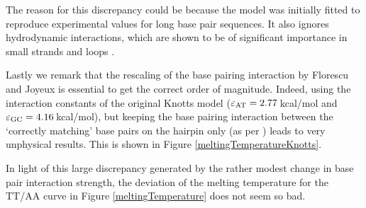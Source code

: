 The reason for this discrepancy could be because the model was initially fitted to reproduce experimental values for long base pair sequences. It also ignores hydrodynamic interactions, which are shown to be of significant importance in small strands and loops \cite{kuznetsov2001semiflexible, shen2001loop, vallone1999melting}.

Lastly we remark that the rescaling of the base pairing interaction by Florescu and Joyeux is essential to get the correct order of magnitude.
Indeed, using the interaction constants of the original Knotts model ($\varepsilon_\text{AT} = 2.77$\,kcal/mol and $\varepsilon_\text{GC} = 4.16$\,kcal/mol), but keeping the base pairing interaction between the `correctly matching' base pairs on the hairpin only (as per \cite{florescu2011thermal}) leads to very unphysical results. This is shown in Figure \ref{meltingTemperatureKnotts}. 

In light of this large discrepancy generated by the rather modest change in base pair interaction strength, the deviation of the melting temperature for the TT/AA curve in Figure \ref{meltingTemperature} does not seem so bad.


